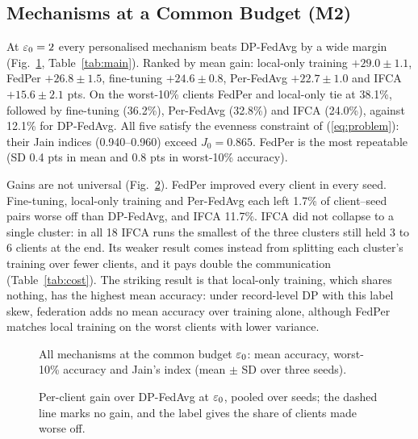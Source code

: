 \subsection{Mechanisms at a Common Budget (M2)}
At $\varepsilon_0=2$ every personalised mechanism beats DP-FedAvg by a wide margin (Fig.~\ref{fig:m2bars},
Table~\ref{tab:main}). Ranked by mean gain: local-only training $+29.0\pm1.1$, FedPer $+26.8\pm1.5$, fine-tuning
$+24.6\pm0.8$, Per-FedAvg $+22.7\pm1.0$ and IFCA $+15.6\pm2.1$ pts. On the worst-10\% clients FedPer and local-only
tie at 38.1\%, followed by fine-tuning (36.2\%), Per-FedAvg (32.8\%) and IFCA (24.0\%), against 12.1\% for
DP-FedAvg. All five satisfy the evenness constraint of (\ref{eq:problem}): their Jain indices (0.940--0.960) exceed
$J_0=0.865$. FedPer is the most repeatable (SD 0.4 pts in mean and 0.8 pts in worst-10\% accuracy).

Gains are not universal (Fig.~\ref{fig:gain}). FedPer improved every client in every seed. Fine-tuning, local-only
training and Per-FedAvg each left 1.7\% of client--seed pairs worse off than DP-FedAvg, and IFCA 11.7\%. IFCA did not
collapse to a single cluster: in all 18 IFCA runs the smallest of the three clusters still held 3 to 6 clients at the
end. Its weaker result comes instead from splitting each cluster's training over fewer clients, and it
pays double the communication (Table~\ref{tab:cost}). The striking result is that local-only training, which shares
nothing, has the highest mean accuracy: under record-level DP with this label skew, federation adds no mean accuracy
over training alone, although FedPer matches local training on the worst clients with lower variance.

\begin{figure}[!t]
\centering
{}
\caption{All mechanisms at the common budget $\eps_0$: mean accuracy, worst-10\% accuracy and Jain's index
(mean $\pm$ SD over three seeds).}
\label{fig:m2bars}
\end{figure}

\begin{table}[!t]
\caption{Main results at the common budget $\eps_0$ on CIFAR-10 (mean $\pm$ SD over three seeds). Gain is relative
to DP-FedAvg at the same budget; MIA AUC = membership-inference area under the curve (0.5 = random guessing); Comm.
= total megabytes exchanged.}
\label{tab:main}
\centering
\footnotesize
{}
\end{table}

\begin{figure}[!t]
\centering
{}
\caption{Per-client gain over DP-FedAvg at $\eps_0$, pooled over seeds; the dashed line marks no gain, and the
label gives the share of clients made worse off.}
\label{fig:gain}
\end{figure}

